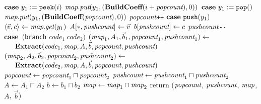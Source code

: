 \begin{algorithm}
\begin{algorithmic}
\UND
\STATE \vspace{-6pt}
\STATE $\mbox{\bf case}~y_1 := \mbox{\tt peek}(i)$
\IND
\STATE $\mbox{\it map}.\mbox{\it put}(y_1, (\mbox{\bf BuildCoeff}(i + \mbox{\it popcount}), 0))$
\UND
\STATE \vspace{-6pt}
\STATE $\mbox{\bf case}~y_1 := \mbox{\tt pop}()$
\IND
\STATE $\mbox{\it map}.\mbox{\it put}(y_1, (\mbox{\bf BuildCoeff}(\mbox{\it popcount}), 0))$
\STATE $\mbox{\it popcount}$\verb|++|
\UND
\STATE \vspace{-6pt}
\STATE $\mbox{\bf case}~\mbox{\tt push}(y_1)$
\IND
\STATE $\langle{\vec v}, {c}\rangle \leftarrow \mbox{\it map}.\mbox{\it get}(y_1)$
\STATE $A[*, \mbox{\it pushcount}] \leftarrow \vec v$
\STATE $b[\mbox{\it pushcount}] \leftarrow c$
\STATE $\mbox{\it pushcount}$\verb|--|
\UND
\STATE \vspace{-6pt}
\STATE \mbox{\bf case}~({\tt branch} $code_1~code_2)$
\IND
\STATE $(\mbox{\it map}_1, A_1, {\vec b_1}, \mbox{\it popcount}_1, \mbox{\it pushcount}_1) \leftarrow$ \\
\verb+   +${\mbox{\bf Extract}}(\mbox{\it code}_1, \mbox{\it map}, A, {\vec b}, \mbox{\it popcount}, \mbox{\it pushcount})$
\STATE $(\mbox{\it map}_2, A_2, {\vec b_2}, \mbox{\it popcount}_2, \mbox{\it pushcount}_2) \leftarrow$ \\ 
\verb+   +${\mbox{\bf Extract}}(\mbox{\it code}_2, \mbox{\it map}, A, {\vec b}, \mbox{\it popcount}, \mbox{\it pushcount})$
\STATE $\mbox{\it popcount} \leftarrow \mbox{\it popcount}_1 \sqcap \mbox{\it popcount}_2$
\STATE $\mbox{\it pushcount} \leftarrow \mbox{\it pushcount}_1 \sqcap \mbox{\it pushcount}_2$
\STATE $A \leftarrow A_1 \sqcap A_2$
\STATE $b \leftarrow b_1 \sqcap b_2$
\STATE $\mbox{\it map} \leftarrow \mbox{\it map}_1 \sqcap \mbox{\it map}_2$
\UND
\UND %
\ENDFOR
\STATE return ($\mbox{\it popcount}$, $\mbox{\it pushcount}$, $\mbox{\it map}$, $A$, ${\vec b}$)
\end{algorithmic}
\end{algorithm}
